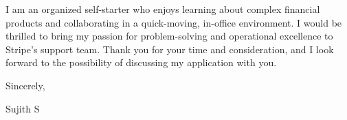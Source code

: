 \documentclass[a4paper,11pt]{article}
\begin{document}
I am an organized self-starter who enjoys learning about complex financial products and collaborating in a quick-moving, in-office environment. I would be thrilled to bring my passion for problem-solving and operational excellence to Stripe's support team. Thank you for your time and consideration, and I look forward to the possibility of discussing my application with you.

Sincerely,

\vspace{1em}
Sujith S
\end{document}
